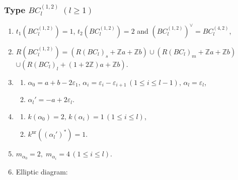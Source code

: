 \documentclass[11pt]{amsart}
\newcommand{\Z}{\mathbb{Z}}
\newcommand{\nr}{\mathrm{nr}}
\newtheorem{lemma}[thm]{Lemma}%
\newcommand{\vep}{\varepsilon}
\begin{document}
{%

\subsubsection{Type $BC_l^{(1,2)}\; (l\geq 1)$}\label{data:BC-1}
\begin{enumerate}
\item $t_1(BC_l^{(1,2)})=1$, \; $t_2(BC_l^{(1,2)})=2$ and 
$(BC_l^{(1,2)})^\vee=BC_l^{(4,2)}$,
\item $R(BC_l^{(1,2)})=(R(BC_l)_s+\Z a+\Z b) \cup (R(BC_l)_m+\Z a+\Z b)$ \\
 $\cup (R(BC_l)_l+(1+2\Z)a+\Z b)$. 
\item 
\begin{enumerate}
\item[i)] $\alpha_0=a+b-2\vep_1, \, \alpha_i=\vep_i-\vep_{i+1}\, (1\leq i\leq l-1), \, \alpha_l=\vep_l$, 
\item[ii)] $\alpha_l'= -a+2\vep_l$.
\end{enumerate}
\item
\begin{enumerate}
\item[i)] $k(\alpha_0)=2,\, k(\alpha_i)=1\, (1\leq i\leq l)$, 
\item[ii)] $k^{\nr}((\alpha_l')^\ast)=1$. 
\end{enumerate}
\item $m_{\alpha_0}=2, \; m_{\alpha_i}=4\, (1\leq i\leq l)$.
\item Elliptic diagram:
\begin{center}
\end{center}
\end{enumerate}}
\end{document}
